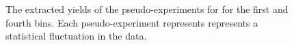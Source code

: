 \begin{figure}[t]
  \caption{The extracted yields of the pseudo-experiments for \leppt for the first and fourth bins. Each pseudo-experiment represents represents a statistical fluctuation in the data.}\label{fig:stats_data_toys_2}
\end{figure}



